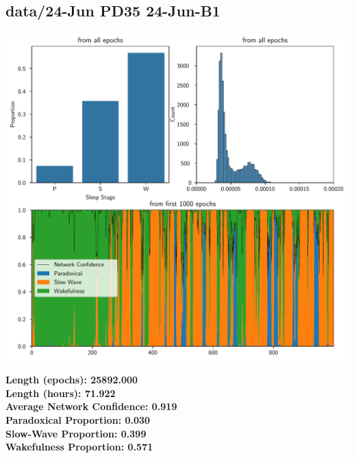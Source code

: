         \subsection*{ data/24-Jun PD35 24-Jun-B1 }
        \begin{center}
        \begin{adjustbox}{width=1\textwidth}
        \includegraphics[page=23]{figs.pdf}
        \end{adjustbox}
        \end{center}
        \large\textbf{Length (epochs): 25892.000}\\
        \textbf{Length (hours): 71.922}\\
        \textbf{Average Network Confidence: 0.919}\\
        \textbf{Paradoxical Proportion: 0.030}\\
        \textbf{Slow-Wave Proportion: 0.399}\\
        \textbf{Wakefulness Proportion: 0.571}\\
        
